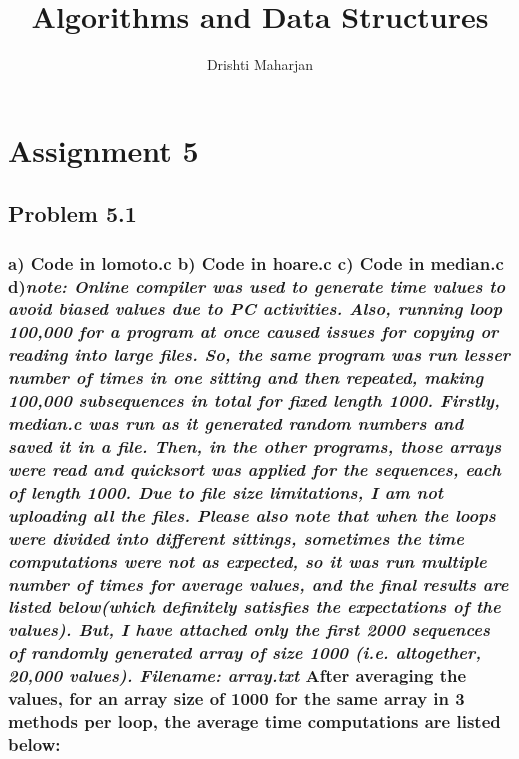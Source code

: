 \documentclass[a4paper,12pt]{article}
\begin{document}
\title{Algorithms and Data Structures }
\author{Drishti Maharjan}
\maketitle
\section*{\center Assignment 5}
\subsection*{\newline\newline Problem 5.1 \newline}
\subsubsection*{\textnormal{a) Code in lomoto.c \newline\newline
b) Code in hoare.c \newline\newline
c) Code in median.c\newline \newline
d)\textit {note: Online compiler was used to generate time values to avoid biased values due to PC activities. Also, running loop 100,000 for a program at once caused issues for copying or reading into large files. So, the same program was run lesser number of times in one sitting and then repeated, making 100,000 subsequences in total for fixed length 1000. Firstly, median.c was run as it generated random numbers and saved it in a file. Then, in the other programs, those arrays were read and quicksort was applied for the sequences, each of length 1000. Due to file size limitations, I am not uploading all the files. Please also note that when the loops were divided into different sittings, sometimes the time computations were not as expected, so it was run multiple number of times for average values, and the final results are listed below(which definitely satisfies the expectations of the values). But, I have attached only the first 2000 sequences of randomly generated array of size 1000 (i.e. altogether, 20,000 values). Filename: array.txt\newline\newline}
After averaging the values, for an array size of 1000 for the same array in 3 methods per loop, the average time computations are listed below:\newline\newline
}}
\end{document}
